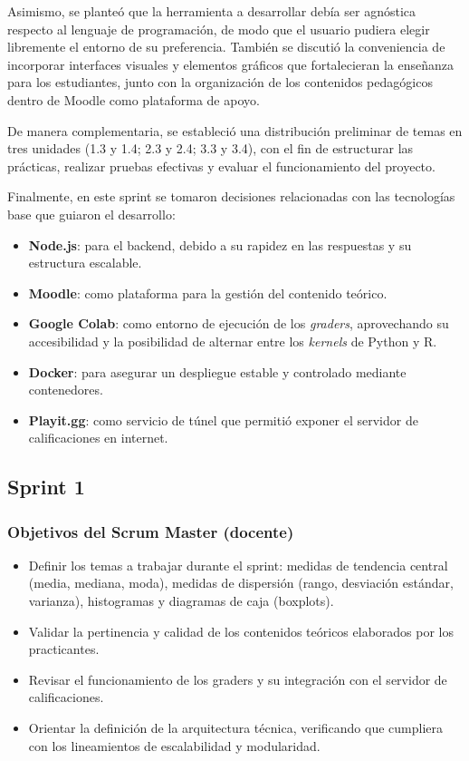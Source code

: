 \documentclass[letter,oneside,12pt,spanish]{report}
\begin{document}
Asimismo, se planteó que la herramienta a desarrollar debía ser agnóstica respecto al lenguaje de programación, de modo que el usuario pudiera elegir libremente el entorno de su preferencia. También se discutió la conveniencia de incorporar interfaces visuales y elementos gráficos que fortalecieran la enseñanza para los estudiantes, junto con la organización de los contenidos pedagógicos dentro de Moodle como plataforma de apoyo.  

De manera complementaria, se estableció una distribución preliminar de temas en tres unidades (1.3 y 1.4; 2.3 y 2.4; 3.3 y 3.4), con el fin de estructurar las prácticas, realizar pruebas efectivas y evaluar el funcionamiento del proyecto.  

Finalmente, en este sprint se tomaron decisiones relacionadas con las tecnologías base que guiaron el desarrollo:  

\begin{itemize}
	\item \textbf{Node.js}: para el backend, debido a su rapidez en las respuestas y su estructura escalable.  
	\item \textbf{Moodle}: como plataforma para la gestión del contenido teórico.  
	\item \textbf{Google Colab}: como entorno de ejecución de los \textit{graders}, aprovechando su accesibilidad y la posibilidad de alternar entre los \textit{kernels} de Python y R.  
	\item \textbf{Docker}: para asegurar un despliegue estable y controlado mediante contenedores.  
	\item \textbf{Playit.gg}: como servicio de túnel que permitió exponer el servidor de calificaciones en internet.  
\end{itemize}

\subsection{Sprint 1}

\subsubsection*{Objetivos del Scrum Master (docente)}
\begin{itemize}
	\item Definir los temas a trabajar durante el sprint: medidas de tendencia central (media, mediana, moda), medidas de dispersión (rango, desviación estándar, varianza), histogramas y diagramas de caja (boxplots).
	\item Validar la pertinencia y calidad de los contenidos teóricos elaborados por los practicantes.
	\item Revisar el funcionamiento de los graders y su integración con el servidor de calificaciones.
	\item Orientar la definición de la arquitectura técnica, verificando que cumpliera con los lineamientos de escalabilidad y modularidad.
\end{itemize}
\end{document}

